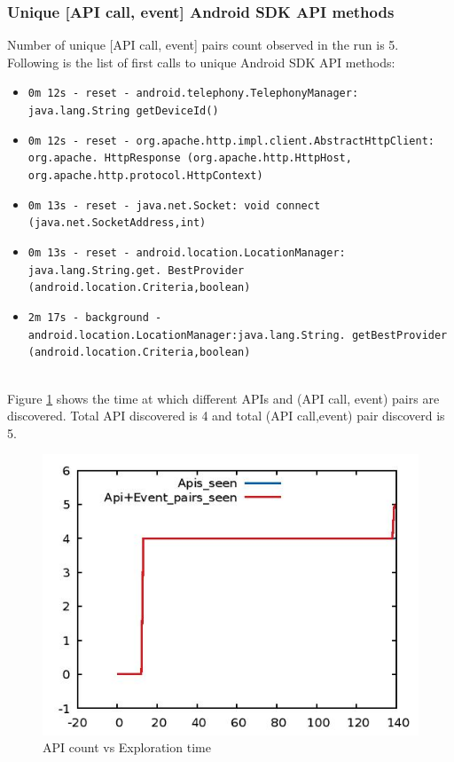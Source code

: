 \subsubsection{Unique [API call, event] Android SDK API methods}
Number of unique [API call, event] pairs count observed in the run is 5. Following is the list of first calls to unique Android SDK API methods:
\begin{itemize}
    \item \texttt{0m 12s - reset - android.telephony.TelephonyManager: java.lang.String getDeviceId()}
\item \texttt{0m 12s -  reset - org.apache.http.impl.client.AbstractHttpClient: org.apache. HttpResponse (org.apache.http.HttpHost, org.apache.http.protocol.HttpContext)}
\item \texttt{0m 13s -  reset - java.net.Socket: void connect (java.net.SocketAddress,int)}
\item \texttt{0m 13s -  reset - android.location.LocationManager: java.lang.String.get. BestProvider (android.location.Criteria,boolean)}
\item \texttt{2m 17s - background - android.location.LocationManager:java.lang.String. getBestProvider\\(android.location.Criteria,boolean)}

\end{itemize}
\\
\newline
Figure \ref{fig:bp3} shows the time at which different APIs and (API call, event) pairs are discovered. Total API discovered is 4 and total (API call,event) pair discoverd is 5.
\begin{figure}[!h]
  \centering
  \includegraphics [scale=1.4] {bp3.jpg}
  \caption{API count vs Exploration time}
  \label{fig:bp3}
\end{figure}

